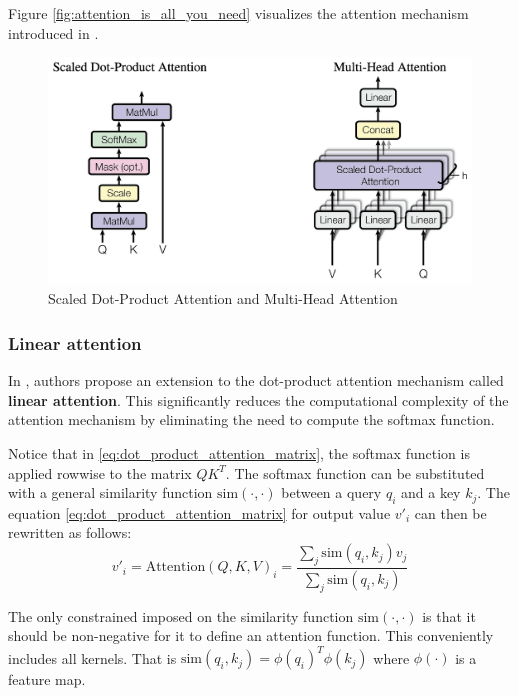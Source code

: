 \documentclass[a4paper, twoside]{report}
\theoremstyle{definition}
\numberwithin{equation}{section}
\begin{document}
Figure \ref{fig:attention_is_all_you_need} visualizes the attention mechanism introduced in \cite{1706.03762}.

\begin{figure}[h!]
    \centering
    \includegraphics[scale=0.15]{scaled_dot_product_attention.png}
    \caption{Scaled Dot-Product Attention and Multi-Head Attention \cite{1706.03762}}
    \label{fig:scaled_dot_product_attention}
\end{figure}




\subsubsection{Linear attention}

In \cite{2006.16236}, authors propose an extension to the dot-product attention mechanism called \textbf{linear attention}.
This significantly reduces the computational complexity of the attention mechanism by eliminating the need to compute the softmax function.

Notice that in \ref{eq:dot_product_attention_matrix}, the softmax function is applied rowwise to the matrix $Q K^T$.
The softmax function can be substituted with a general similarity function $\text{sim}(\cdot, \cdot)$ between a query $q_i$ and a key $k_j$.
The equation \ref{eq:dot_product_attention_matrix} for output value $v'_i$ can then be rewritten as follows:
\begin{equation}
    v'_i=\text{Attention}(Q, K, V)_i=\frac{\sum_j \text{sim}(q_i, k_j) v_j}{\sum_j \text{sim}(q_i, k_j)}
\end{equation}

The only constrained imposed on the similarity function $\text{sim}(\cdot, \cdot)$ is that it should be non-negative for it to define an attention function.
This conveniently includes all kernels. That is $\text{sim}(q_i, k_j)=\phi(q_i)^T \phi(k_j)$ where $\phi(\cdot)$ is a feature map.
\end{document}
